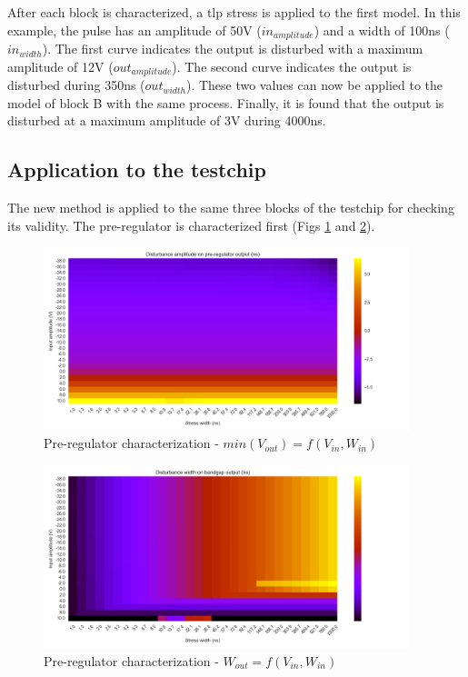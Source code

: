 After each block is characterized, a \gls{tlp} stress is applied to the first model.
In this example, the pulse has an amplitude of 50V ($in_{amplitude}$) and a width of 100ns ($in_{width}$).
The first curve indicates the output is disturbed with a maximum amplitude of 12V ($out_{amplitude}$).
The second curve indicates the output is disturbed during 350ns ($out_{width}$).
These two values can now be applied to the model of block B with the same process.
Finally, it is found that the output is disturbed at a maximum amplitude of 3V during 4000ns.

\subsection{Application to the testchip}

The new method is applied to the same three blocks of the testchip for checking its validity.
The pre-regulator is characterized first (Figs \ref{fig:pre-reg-cz-v2-amp} and \ref{fig:pre-reg-cz-v2-width}).

\begin{figure}[!h]
  \centering
  \includegraphics[width=0.95\textwidth]{src/4/figures/vpre_cz_V2_amplitude.png}
  \caption{Pre-regulator characterization - $min(V_{out}) = f(V_{in}, W_{in})$}
  \label{fig:pre-reg-cz-v2-amp}
\end{figure}

\begin{figure}[!hp]
  \centering
  \includegraphics[width=0.95\textwidth]{src/4/figures/vpre_cz_V2_width.png}
  \caption{Pre-regulator characterization - $W_{out} = f(V_{in}, W_{in})$}
  \label{fig:pre-reg-cz-v2-width}
\end{figure}

